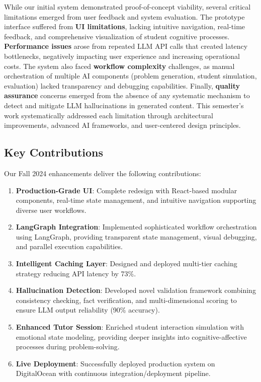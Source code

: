 \documentclass[11pt]{article}
\begin{document}
While our initial system demonstrated proof-of-concept viability, several critical limitations emerged from user feedback and system evaluation. The prototype interface suffered from \textbf{UI limitations}, lacking intuitive navigation, real-time feedback, and comprehensive visualization of student cognitive processes. \textbf{Performance issues} arose from repeated LLM API calls that created latency bottlenecks, negatively impacting user experience and increasing operational costs. The system also faced \textbf{workflow complexity} challenges, as manual orchestration of multiple AI components (problem generation, student simulation, evaluation) lacked transparency and debugging capabilities. Finally, \textbf{quality assurance} concerns emerged from the absence of any systematic mechanism to detect and mitigate LLM hallucinations in generated content. This semester's work systematically addressed each limitation through architectural improvements, advanced AI frameworks, and user-centered design principles.

\subsection{Key Contributions}

Our Fall 2024 enhancements deliver the following contributions:

\begin{enumerate}
    \item \textbf{Production-Grade UI}: Complete redesign with React-based modular components, real-time state management, and intuitive navigation supporting diverse user workflows.
    
    \item \textbf{LangGraph Integration}: Implemented sophisticated workflow orchestration using LangGraph, providing transparent state management, visual debugging, and parallel execution capabilities.
    
    \item \textbf{Intelligent Caching Layer}: Designed and deployed multi-tier caching strategy reducing API latency by 73\%.
    
    \item \textbf{Hallucination Detection}: Developed novel validation framework combining consistency checking, fact verification, and multi-dimensional scoring to ensure LLM output reliability (90\% accuracy).
    
    \item \textbf{Enhanced Tutor Session}: Enriched student interaction simulation with emotional state modeling, providing deeper insights into cognitive-affective processes during problem-solving.
    
    \item \textbf{Live Deployment}: Successfully deployed production system on DigitalOcean with continuous integration/deployment pipeline.
\end{enumerate}
\end{document}
